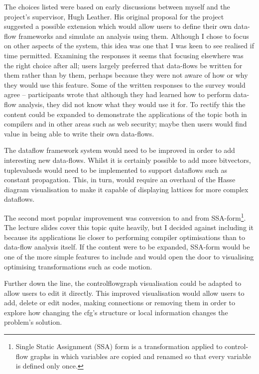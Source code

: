\documentclass[bsc,twoside,singlespacing,parskip,logo,notimes,normalheadings]{infthesis}
\begin{document}
    The choices listed were based on early discussions between myself
    and the project's supervisor, Hugh Leather. His original proposal
    for the project suggested a possible extension which would allow
    users to define their own data-flow frameworks and simulate an
    analysis using them. Although I chose to focus on other aspects of
    the system, this idea was one that I was keen to see realised if
    time permitted. Examining the responses it seems that focusing
    elsewhere was the right choice after all; users largely preferred
    that data-flows be written for them rather than by them, perhaps
    because they were not aware of how or why they would use this
    feature. Some of the written responses to the survey would agree
    -- participants wrote that although they had learned how to
    perform data-flow analysis, they did not know what they would use
    it for. To rectify this the content could be expanded to
    demonstrate the applications of the topic both in compilers and in
    other areas such as web security\cite{TaintedFlow}; maybe then
    users would find value in being able to write their own
    data-flows.

    The \gls{dataflow} framework system would need to be improved in
    order to add interesting new data-flows. Whilst it is certainly
    possible to add more \gls{bitvector}s, \gls{tuplevalued}s would
    need to be implemented to support \gls{dataflow}s such as constant
    propagation. This, in turn, would require an overhaul of the Hasse
    diagram visualisation to make it capable of displaying lattices
    for more complex \gls{dataflow}s.

    The second most popular improvement was conversion to and from
    SSA-form\footnote{Single Static Assignment (SSA) form is a
      transformation applied to control-flow graphs in which variables
      are copied and renamed so that every variable is defined only
      once.}. The lecture slides cover this topic quite heavily, but I
    decided against including it because its applications lie closer
    to performing compiler optimisations than to data-flow analysis
    itself. If the content were to be expanded, SSA-form would be one
    of the more simple features to include and would open the door to
    visualising optimising transformations such as code motion.

    Further down the line, the \gls{controlflowgraph} visualisation
    could be adapted to allow users to edit it directly. This improved
    visualisation would allow users to add, delete or edit nodes,
    making connections or removing them in order to explore how
    changing the \gls{cfg}'s structure or local information changes
    the problem's solution.
\end{document}
